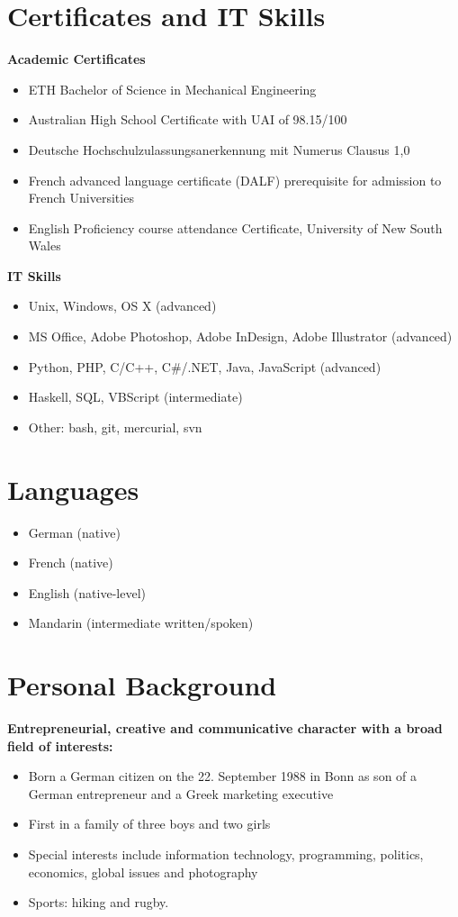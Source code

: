 \documentclass[margin]{res}
\begin{document}
\begin{resume}
\section{Certificates and IT Skills}
  {\bf Academic Certificates}
  \begin{itemize} \itemsep -0.5pt 
  \item ETH Bachelor of Science in Mechanical Engineering
  \item Australian High School Certificate with UAI of 98.15/100
  \item Deutsche Hochschulzulassungsanerkennung mit Numerus Clausus 1,0
  \item French advanced language certificate (DALF) prerequisite for admission to French Universities
  \item English Proficiency course attendance Certificate, University of New South Wales
  \end{itemize}
  {\bf IT Skills}
  \begin{itemize} \itemsep -0.5pt 
  \item Unix, Windows, OS X (advanced)
  \item MS Office, Adobe Photoshop, Adobe InDesign, Adobe Illustrator (advanced)
  \item Python, PHP, C/C++, C\#/.NET, Java, JavaScript (advanced)
  \item Haskell, SQL, VBScript (intermediate)
  \item Other: bash, git, mercurial, svn
  \end{itemize}

\section{Languages}
  \begin{itemize} \itemsep -0.5pt 
  \item German (native)
  \item French (native)
  \item English (native-level)
  \item Mandarin (intermediate written/spoken)
  \end{itemize}

\section{Personal Background}
{\bf Entrepreneurial, creative and communicative character with a broad field of interests:}
  \begin{itemize} \itemsep -0.5pt 
  \item Born a German citizen on the 22. September 1988 in Bonn as son of a German entrepreneur and a Greek marketing executive
  \item First in a family of three boys and two girls
  \item Special interests include information technology, programming, politics, economics, global issues and photography
  \item Sports: hiking and rugby.
  \end{itemize}


\end{resume}
\end{document}
